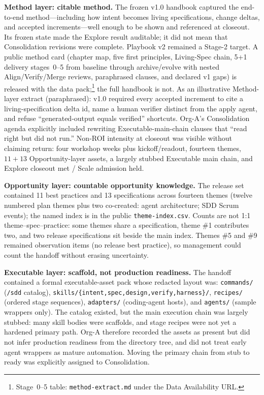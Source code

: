 \documentclass[10pt,conference]{IEEEtran}
\begin{document}
\textbf{Method layer: citable method.}
The frozen v1.0 handbook captured the end-to-end method---including how
intent becomes living specifications, change deltas, and accepted
increments---well enough to be shown and referenced at closeout.
Its frozen state made the Explore result auditable; it did not mean that
Consolidation revisions were complete.
Playbook v2 remained a Stage-2 target.
A public method card (chapter map, five first principles, Living-Spec chain,
5+1 delivery stages~0--5 from baseline through archive/evolve with nested
Align/Verify/Merge reviews, paraphrased clauses, and declared v1 gaps) is
released with the data pack;\footnote{Stage~0--5 table:
\texttt{method-extract.md} under the Data Availability URL.}
the full handbook is not.
As an illustrative Method-layer extract (paraphrased): v1.0 required every
accepted increment to cite a living-specification delta id, name a human
verifier distinct from the apply agent, and refuse ``generated-output equals
verified'' shortcuts.
Org-A's Consolidation agenda explicitly included rewriting Executable-main-chain
clauses that ``read right but did not run.''
Non-ROI intensity at closeout was visible without claiming return: four workshop
weeks plus kickoff/readout, fourteen themes, $11{+}13$ Opportunity-layer assets,
a largely stubbed Executable main chain, and Explore closeout met / Scale
admission held.

\textbf{Opportunity layer: countable opportunity knowledge.}
The release set contained 11 best practices and 13 specifications across
fourteen themes (twelve numbered plan themes plus two co-created: agent
architecture; SDD Scrum events); the named index is in the public
\texttt{theme-index.csv}.
Counts are not 1:1 theme--spec--practice: some themes share a specification,
theme \#1 contributes two, and two release specifications sit beside the main
index.
Themes \#5 and \#9 remained observation items (no release best practice), so
management could count the handoff without erasing uncertainty.

\textbf{Executable layer: scaffold, not production readiness.}
The handoff contained a formal executable-asset pack whose redacted layout
was:
\texttt{commands/} (\texttt{/sdd} catalog),
\texttt{skills/\{intent,spec,design,verify,harness\}/},
\texttt{recipes/} (ordered stage sequences),
\texttt{adapters/} (coding-agent hosts), and
\texttt{agents/} (sample wrappers only).
The catalog existed, but the main execution chain was largely stubbed:
many skill bodies were scaffolds, and stage recipes were not yet a hardened
primary path.
Org-A therefore recorded the assets as present but did not infer production
readiness from the directory tree, and did not treat early agent wrappers as
mature automation.
Moving the primary chain from stub to ready was explicitly assigned to
Consolidation.
\end{document}
